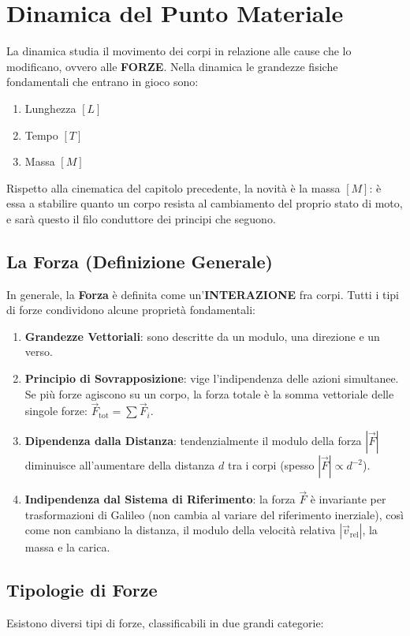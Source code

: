 \chapter{Dinamica del Punto Materiale}
La dinamica studia il movimento dei corpi in relazione alle cause che lo modificano, ovvero alle \textbf{FORZE}.
Nella dinamica le grandezze fisiche fondamentali che entrano in gioco sono:
\begin{enumerate}
    \item Lunghezza $[L]$
    \item Tempo $[T]$
    \item Massa $[M]$
\end{enumerate}
Rispetto alla cinematica del capitolo precedente, la novità è la massa $[M]$: è essa a stabilire quanto un corpo resista al cambiamento del proprio stato di moto, e sarà questo il filo conduttore dei principi che seguono.

\section{La Forza (Definizione Generale)}
In generale, la \textbf{Forza} è definita come un'\textbf{INTERAZIONE} fra corpi.
Tutti i tipi di forze condividono alcune proprietà fondamentali:
\begin{enumerate}
    \item \textbf{Grandezze Vettoriali}: sono descritte da un modulo, una direzione e un verso.
    \item \textbf{Principio di Sovrapposizione}: vige l'indipendenza delle azioni simultanee. Se più forze agiscono su un corpo, la forza totale è la somma vettoriale delle singole forze: $\vec{F}_{\text{tot}} = \sum \vec{F}_i$.
    \item \textbf{Dipendenza dalla Distanza}: tendenzialmente il modulo della forza $|\vec{F}|$ diminuisce all'aumentare della distanza $d$ tra i corpi (spesso $|\vec{F}| \propto d^{-2}$).
    \item \textbf{Indipendenza dal Sistema di Riferimento}: la forza $\vec{F}$ è invariante per trasformazioni di Galileo (non cambia al variare del riferimento inerziale), così come non cambiano la distanza, il modulo della velocità relativa $|\vec{v}_{\text{rel}}|$, la massa e la carica.
\end{enumerate}

\section{Tipologie di Forze}
Esistono diversi tipi di forze, classificabili in due grandi categorie:

